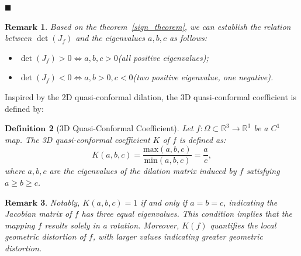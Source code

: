 \documentclass{article}
\newtheorem{defn}{\noindent $\mathbf{Definition}$}[section]
\newtheorem{remark}[defn]{$\mathbf{Remark}$}
\begin{document}
\hfill $\blacksquare$ 

\begin{remark}
Based on the theorem~\ref{sign_theorem}, we can establish the relation between $\operatorname{det}\left(J_f \right)$ and the eigenvalues $a,b,c$ as follows:
    \begin{itemize}
        \item $\operatorname{det}\left(J_f \right) >0 \Leftrightarrow a,b,c >0$(all positive eigenvalues);
        \item $\operatorname{det}\left(J_f \right) <0 \Leftrightarrow a,b>0, c<0$(two positive eigenvalue, one negative).
    \end{itemize}
\end{remark}



Inspired by the 2D quasi-conformal dilation, the 3D quasi-conformal coefficient is defined by:
\begin{defn}[3D Quasi-Conformal Coefficient]\label{def:3D_coefficient}
    Let $f: \Omega \subset \mathbb{R}^3 \to \mathbb{R}^3$ be a $C^1$ map. The \emph{3D quasi-conformal coefficient} $K$ of $f$ is defined as:
    \begin{equation}\label{eqt:K}
    K(a,b,c) = \frac{\text{max}(a,b,c)}{\text{min}(a,b,c)} = \frac{a}{c},
    \end{equation}
    where $a, b, c$ are the eigenvalues of the dilation matrix induced by $f$ satisfying $a \geq b \geq c$.
\end{defn}

\begin{remark}
      Notably, $K(a, b, c) = 1$ if and only if $a = b = c$, indicating the Jacobian matrix of $f$ has three equal eigenvalues. This condition implies that the mapping $f$ results solely in a rotation. Moreover, $K(f)$ quantifies the local geometric distortion of $f$, with larger values indicating greater geometric distortion.
\end{remark}
\end{document}
